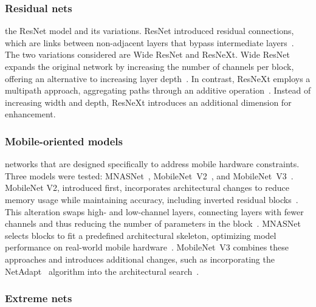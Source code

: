 \subsubsection{Residual nets}

 the ResNet model and its variations. ResNet introduced residual connections, which are links between non-adjacent layers that bypass intermediate layers~\cite{ResNet}. The two variations considered are Wide ResNet and ResNeXt. Wide ResNet expands the original network by increasing the number of channels per block, offering an alternative to increasing layer depth~\cite{WideResNet}. In contrast, ResNeXt employs a multipath approach, aggregating paths through an additive operation~\cite{ResNeXt}. Instead of increasing width and depth, ResNeXt introduces an additional dimension for enhancement.

\subsubsection{Mobile-oriented models}

 networks that are designed specifically to address mobile hardware constraints. Three models were tested: MNASNet~\cite{MNASNet}, MobileNet~V2~\cite{MobileNetV2}, and MobileNet~V3~\cite{MobileNetV3}. MobileNet V2, introduced first, incorporates architectural changes to reduce memory usage while maintaining accuracy, including inverted residual blocks~\cite{MobileNetV2}. This alteration swaps high- and low-channel layers, connecting layers with fewer channels and thus reducing the number of parameters in the block~\cite{MobileNetV2}. MNASNet selects blocks to fit a predefined architectural skeleton, optimizing model performance on real-world mobile hardware~\cite{MNASNet}. MobileNet~V3 combines these approaches and introduces additional changes, such as incorporating the NetAdapt~\cite{NetAdapt} algorithm into the architectural search~\cite{MobileNetV3}.

\subsubsection{Extreme nets}

